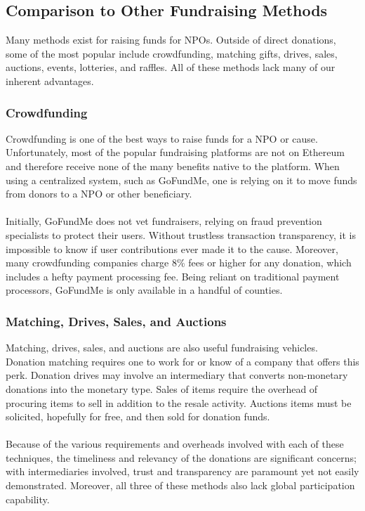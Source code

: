 \documentclass[11pt]{article}
\begin{document}
\subsection{Comparison to Other Fundraising Methods}

Many methods exist for raising funds for NPOs. Outside of direct donations, some of the most popular include crowdfunding, matching gifts, drives, sales, auctions, events, lotteries, and raffles. All of these methods lack many of our inherent advantages.

\subsubsection{Crowdfunding}

Crowdfunding is one of the best ways to raise funds for a NPO or cause. Unfortunately, most of the popular fundraising platforms are not on Ethereum and therefore receive none of the many benefits native to the platform. When using a centralized system, such as GoFundMe, one is relying on it to move funds from donors to a NPO or other beneficiary.\\\\
Initially, GoFundMe does not vet fundraisers, relying on fraud prevention specialists to protect their users. Without trustless transaction transparency, it is impossible to know if user contributions ever made it to the cause. Moreover, many crowdfunding companies charge 8\% fees or higher for any donation, which includes a hefty payment processing fee. Being reliant on traditional payment processors, GoFundMe is only available in a handful of counties.

\subsubsection{Matching, Drives, Sales, and Auctions}

Matching, drives, sales, and auctions are also useful fundraising vehicles. Donation matching requires one to work for or know of a company that offers this perk. Donation drives may involve an intermediary that converts non-monetary donations into the monetary type. Sales of items require the overhead of procuring items to sell in addition to the resale activity. Auctions items must be solicited, hopefully for free, and then sold for donation funds.\\\\
Because of the various requirements and overheads involved with each of these techniques, the timeliness and relevancy of the donations are significant concerns; with intermediaries involved, trust and transparency are paramount yet not easily demonstrated. Moreover, all three of these methods also lack global participation capability.
\end{document}
